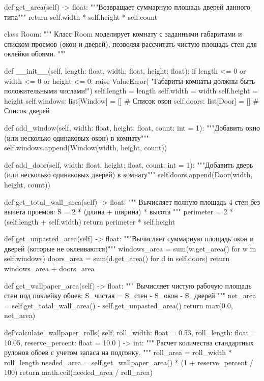 \documentclass[14pt,a4paper]{extarticle}
\begin{document}
\begin{CodeListing}
    def get_area(self) -> float:
        """Возвращает суммарную площадь дверей данного типа"""
        return self.width * self.height * self.count


class Room:
    """
    Класс Room моделирует комнату с заданными габаритами и списком проемов
    (окон и дверей), позволяя рассчитать чистую площадь стен для оклейки обоями.
    """

    def __init__(self, length: float, width: float, height: float):
        if length <= 0 or width <= 0 or height <= 0:
            raise ValueError(
                "Габариты комнаты должны быть положительными числами!")
        self.length = length
        self.width = width
        self.height = height
        self.windows: list[Window] = []  # Список окон
        self.doors: list[Door] = []      # Список дверей

    def add_window(self, width: float, height: float, count: int = 1):
        """Добавить окно (или несколько одинаковых окон) в комнату"""
        self.windows.append(Window(width, height, count))

    def add_door(self, width: float, height: float, count: int = 1):
        """Добавить дверь (или несколько одинаковых дверей) в комнату"""
        self.doors.append(Door(width, height, count))

    def get_total_wall_area(self) -> float:
        """
        Вычисляет полную площадь 4 стен без вычета проемов:
        S = 2 * (длина + ширина) * высота
        """
        perimeter = 2 * (self.length + self.width)
        return perimeter * self.height

    def get_unpasted_area(self) -> float:
        """Вычисляет суммарную площадь окон и дверей (которые не оклеиваются)"""
        windows_area = sum(w.get_area() for w in self.windows)
        doors_area = sum(d.get_area() for d in self.doors)
        return windows_area + doors_area

    def get_wallpaper_area(self) -> float:
        """
        Вычисляет чистую рабочую площадь стен под поклейку обоев:
        S_чистая = S_стен - S_окон - S_дверей
        """
        net_area = self.get_total_wall_area() - self.get_unpasted_area()
        return max(0.0, net_area)

    def calculate_wallpaper_rolls(
        self,
        roll_width: float = 0.53,
        roll_length: float = 10.05,
        reserve_percent: float = 10.0
    ) -> int:
        """
        Расчет количества стандартных рулонов обоев с учетом запаса на подгонку.
        """
        roll_area = roll_width * roll_length
        needed_area = self.get_wallpaper_area() * (1 + reserve_percent / 100)
        return math.ceil(needed_area / roll_area)



\end{CodeListing}
\end{document}
